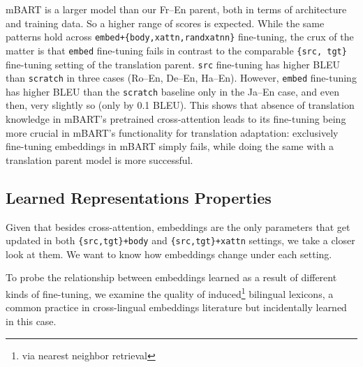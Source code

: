 mBART is a larger model than our Fr--En parent, both in terms of architecture and training data. So a higher range of scores is expected. While the same patterns hold across \texttt{embed+\{body,xattn,randxatnn\}} fine-tuning, the crux of the matter is that \texttt{embed} fine-tuning fails in contrast to the comparable \texttt{\{src, tgt\}} fine-tuning setting of the translation parent. \texttt{src} fine-tuning has higher BLEU than \texttt{scratch} in three cases (Ro--En, De--En, Ha--En). However, \texttt{embed} fine-tuning has higher BLEU than the \texttt{scratch} baseline only in the Ja--En case, and even then, very slightly so (only by 0.1 BLEU). This shows that absence of translation knowledge in mBART's pretrained cross-attention leads to its fine-tuning being more crucial in mBART's functionality for translation adaptation: exclusively fine-tuning embeddings in mBART simply fails, while doing the same with a translation parent model is more successful.

\subsection{Learned Representations Properties}
\label{subsec:align}

Given that besides cross-attention, embeddings are the only parameters that get updated in both \texttt{\{src,tgt\}+body} and \texttt{\{src,tgt\}+xattn} settings, we take a closer look at them. We want to know how embeddings change under each setting. 

To probe the relationship between embeddings learned as a result of different kinds of fine-tuning, we examine the quality of induced\footnote{via nearest neighbor retrieval} bilingual lexicons, a common practice in cross-lingual embeddings literature \cite{artetxe-etal-2017-learning} but incidentally learned in this case. 

